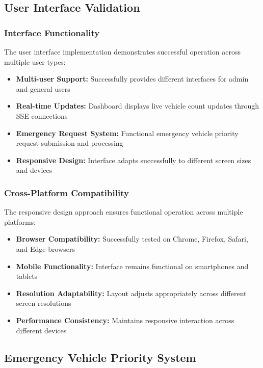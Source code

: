 \documentclass[conference]{IEEEtran}
\begin{document}
\subsection{User Interface Validation}

\subsubsection{Interface Functionality}

The user interface implementation demonstrates successful operation across multiple user types:

\begin{itemize}
\item \textbf{Multi-user Support:} Successfully provides different interfaces for admin and general users
\item \textbf{Real-time Updates:} Dashboard displays live vehicle count updates through SSE connections
\item \textbf{Emergency Request System:} Functional emergency vehicle priority request submission and processing
\item \textbf{Responsive Design:} Interface adapts successfully to different screen sizes and devices
\end{itemize}

\subsubsection{Cross-Platform Compatibility}

The responsive design approach ensures functional operation across multiple platforms:

\begin{itemize}
\item \textbf{Browser Compatibility:} Successfully tested on Chrome, Firefox, Safari, and Edge browsers
\item \textbf{Mobile Functionality:} Interface remains functional on smartphones and tablets
\item \textbf{Resolution Adaptability:} Layout adjusts appropriately across different screen resolutions
\item \textbf{Performance Consistency:} Maintains responsive interaction across different devices
\end{itemize}

\subsection{Emergency Vehicle Priority System}
\end{document}
